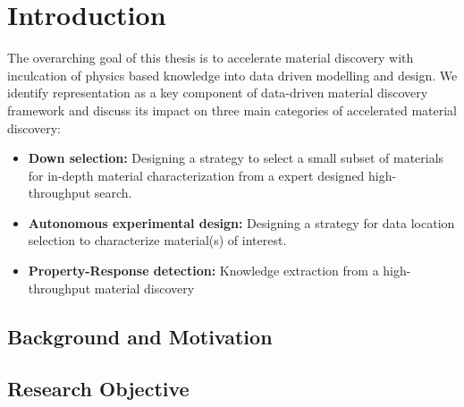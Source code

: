 \chapter{Introduction}\label{chap:intro}
The overarching goal of this thesis is to accelerate material discovery with inculcation of physics based knowledge into data driven modelling and design.
We identify representation as a key component of data-driven material discovery framework and discuss its impact on three main categories of accelerated material discovery:
\begin{itemize}
    \item {\textbf{Down selection: }Designing a strategy to select a small subset of materials for in-depth material characterization from a expert designed high-throughput search.}
    \item {\textbf{Autonomous experimental design: }Designing a strategy for data location selection to characterize material(s) of interest.}
    \item {\textbf{Property-Response detection: }Knowledge extraction from a high-throughput material discovery }
\end{itemize}
\section{Background and Motivation}\label{sec1.1}
 
\section{Research Objective}\label{sec1.2}

